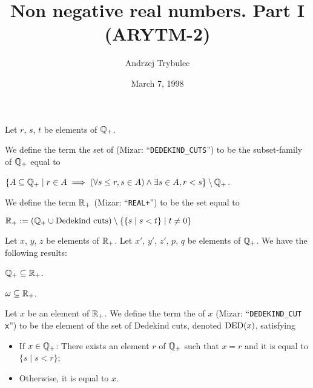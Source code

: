 \documentclass{article}
\title{Non negative real numbers. Part I (ARYTM-2)}
\author{Andrzej Trybulec}
\date{March 7, 1998}
\begin{document}
\maketitle

Let $r$, $s$, $t$ be elements of $\mathbb{Q}_{+}$.
\begin{definition}%
We define the term the set of  (Mizar: ``\verb#DEDEKIND_CUTS#'')
to be the subset-family of $\mathbb{Q}_{+}$ equal to
\begin{defn}
\item $\{A\subseteq\mathbb{Q}_{+}\mid r\in A\implies(\forall s\leq r,s\in A)\land\exists s\in A, r<s\}\setminus\mathbb{Q}_{+}$.
\end{defn}
\end{definition}

\begin{definition}\index{$\RR_{+}$}%
We define the term $\RR_{+}$ (Mizar: ``\verb#REAL+#'') to be the set
equal to
\begin{defn}
\item $\mathbb{R}_{+}:=(\mathbb{Q}_{+}\cup\mbox{Dedekind cuts})\setminus\{\{s\mid s<t\}\mid t\neq0\}$
\end{defn}
\end{definition}

Let $x$, $y$, $z$ be elements of $\RR_{+}$. Let $x'$, $y'$, $z'$, $p$,
$q$ be elements of $\mathbb{Q}_{+}$. We have the following results:
\begin{thm}
\item\label{arytm2:1} $\mathbb{Q}_{+}\subseteq\mathbb{R}_{+}$.
\item\label{arytm2:2} $\omega\subseteq\mathbb{R}_{+}$.
\end{thm}

\begin{definition}
Let $x$ be an element of $\RR_{+}$.
We define the term the  of $x$ (Mizar:
``\verb#DEDEKIND_CUT x#'') to be the element of the set of Dedekind
cuts, denoted $\operatorname{DED}(x)$, satisfying
\begin{defn}
\item \begin{itemize}
\item If $x\in\mathbb{Q}_{+}$: There exists an element $r$ of $\mathbb{Q}_{+}$ such
  that $x=r$ and it is equal to $\{s\mid s<r\}$;
\item Otherwise, it is equal to $x$.
\end{itemize}
\end{defn}
\end{definition}
\end{document}
